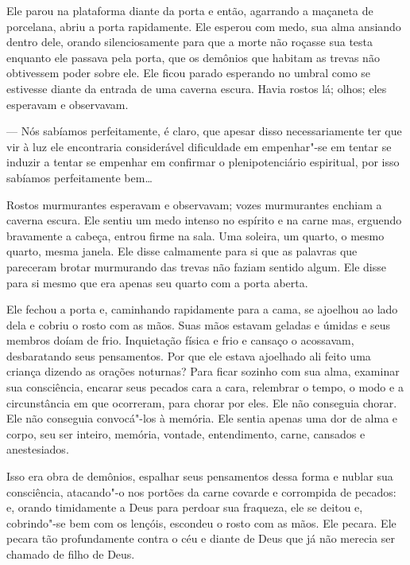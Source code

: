Ele parou na plataforma diante da porta e então, agarrando a maçaneta de
porcelana, abriu a porta rapidamente. Ele esperou com medo, sua alma
ansiando dentro dele, orando silenciosamente para que a morte não
roçasse sua testa enquanto ele passava pela porta, que os demônios que
habitam as trevas não obtivessem poder sobre ele. Ele ficou parado
esperando no umbral como se estivesse diante da entrada de uma caverna
escura. Havia rostos lá; olhos; eles esperavam e observavam.

 --- Nós sabíamos perfeitamente, é claro, que apesar disso necessariamente
ter que vir à luz ele encontraria considerável dificuldade em
empenhar"-se em tentar se induzir a tentar se empenhar em confirmar o
plenipotenciário espiritual, por isso sabíamos perfeitamente bem\ldots{}

Rostos murmurantes esperavam e observavam; vozes murmurantes enchiam a
caverna escura. Ele sentiu um medo intenso no espírito e na carne mas,
erguendo bravamente a cabeça, entrou firme na sala. Uma soleira, um
quarto, o mesmo quarto, mesma janela. Ele disse calmamente para si que as
palavras que pareceram brotar murmurando das trevas não faziam sentido
algum. Ele disse para si mesmo que era apenas seu quarto com a porta
aberta.

Ele fechou a porta e, caminhando rapidamente para a cama, se ajoelhou ao
lado dela e cobriu o rosto com as mãos. Suas mãos estavam geladas e
úmidas e seus membros doíam de frio. Inquietação física e frio e
cansaço o acossavam, desbaratando seus pensamentos. Por que ele estava
ajoelhado ali feito uma criança dizendo as orações noturnas? Para ficar
sozinho com sua alma, examinar sua consciência, encarar seus pecados
cara a cara, relembrar o tempo, o modo e a circunstância em que
ocorreram, para chorar por eles. Ele não conseguia chorar. Ele não
conseguia convocá"-los à memória. Ele sentia apenas uma dor de alma e
corpo, seu ser inteiro, memória, vontade, entendimento, carne, cansados
e anestesiados.

Isso era obra de demônios, espalhar seus pensamentos dessa forma e
nublar sua consciência, atacando"-o nos portões da carne covarde e
corrompida de pecados: e, orando timidamente a Deus para perdoar sua
fraqueza, ele se deitou e, cobrindo"-se bem com os lençóis, escondeu o
rosto com as mãos. Ele pecara. Ele pecara tão profundamente contra o céu e
diante de Deus que já não merecia ser chamado de filho de Deus.

